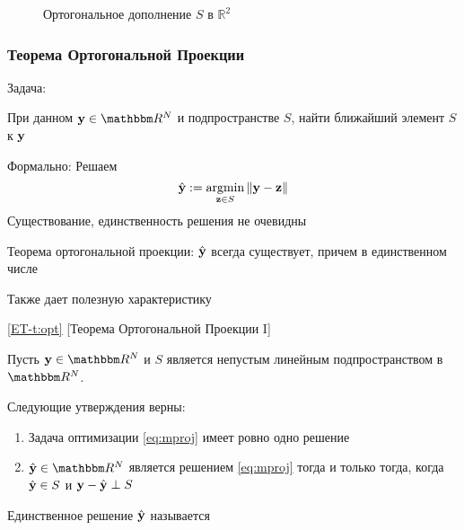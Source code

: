 \begin{frame}

    \vspace{2em}
    \begin{figure}
       \begin{center}
        \resizebox{7.5cm}{!}{}
        \caption{\label{f:orth_comp} Ортогональное дополнение $S$ в $\mathbb{R}^{2}$}
       \end{center}
    \end{figure}
    
\end{frame}

\begin{frame}\frametitle{Теорема Ортогональной Проекции}
    
    \vspace{2em}
    Задача:
    \begin{center}
        При данном $\boldy \in \RR^N$ и подпространстве $S$, 
        найти ближайший элемент $S$ к ${\mathbf y}$
    \end{center}
    
    Формально: Решаем
    \begin{equation}\label{eq:mproj}
        \hboldy := \argmin_{\boldz \in S} \|\boldy - \boldz\|
    \end{equation}
    Существование, единственность решения не очевидны

    Теорема ортогональной проекции: $\hat {\mathbf y}$ всегда существует, 
    причем в единственном числе

    Также дает полезную характеристику

\end{frame}

\begin{frame}
    
     \vspace{2em}
    \Thm\eqref{ET-t:opt}
    [Теорема Ортогональной Проекции I]
    
    Пусть $\boldy \in \RR^N$ и $S$ является непустым линейным подпространством в $\RR^N$. 
    
    Следующие утверждения верны:
    \begin{enumerate}
        \item  Задача оптимизации \eqref{eq:mproj} имеет ровно одно решение
        \item $\hboldy \in \RR^N$ является решением \eqref{eq:mproj}
            тогда и только тогда, когда $\hat {{\mathbf y}} \in S$ и 
            ${\mathbf y} - \hat {{\mathbf y}} \perp S$
    \end{enumerate}
    
    \vspace{.7em}
    Единственное решение $\hat {\mathbf y}$ называется 

\end{frame}

